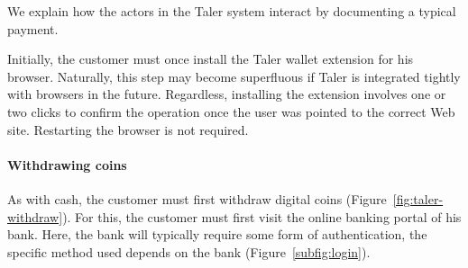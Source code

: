 \documentclass{IEEEtran}
\begin{document}
We explain how the actors in the Taler system interact by documenting
a typical payment.

Initially, the customer must once install the Taler wallet extension
for his browser.  Naturally, this step may become superfluous if
Taler is integrated tightly with browsers in the future.  Regardless,
installing the extension involves one or two clicks to confirm the
operation once the user was pointed to the correct Web site.
Restarting the browser is not required.

\paragraph{Withdrawing coins}


As with cash, the customer must first withdraw digital coins
(Figure~\ref{fig:taler-withdraw}).  For this, the customer must first
visit the online banking portal of his bank.  Here, the bank will
typically require some form of authentication, the specific method
used depends on the bank (Figure~\ref{subfig:login}).
\end{document}
